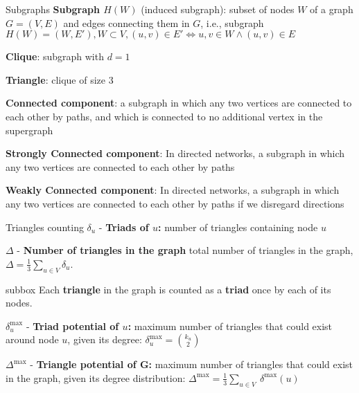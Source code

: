 \begin{textbox}{Subgraphs}
    \textbf{Subgraph $H(W)$} (induced subgraph): subset of nodes $W$ of a graph $G=(V,E)$ and edges connecting them in $G$, i.e., subgraph $H(W)=(W,E'), W \subset V, (u,v) \in E' \iff u,v \in W \wedge (u,v) \in E$

    \textbf{Clique}: subgraph with $d=1$

    \textbf{Triangle}: clique of size 3

    \textbf{Connected component}: a subgraph in which any two vertices are connected to each other by paths, and which is connected to no additional vertex in the supergraph

    \textbf{Strongly Connected component}: In directed networks, a subgraph in which any two vertices are connected to each other by paths

    \textbf{Weakly Connected component}: In directed networks, a subgraph in which any two vertices are connected to each other by paths if we disregard directions
\end{textbox}


\begin{textbox}{Triangles counting}
    $\delta_u$ - \textbf{Triads of $u$:} number of triangles containing node $u$

    $\Delta$ - \textbf{Number of triangles in the graph} total number of triangles in the graph, $\Delta=\frac{1}{3}\sum_{u\in V}\delta_u$.

    \begin{subbox}{subbox}{}
        \tiny{Each \textbf{triangle} in the graph is counted as a \textbf{triad} once by each of its nodes. }
    \end{subbox}

    $\delta^{\max}_u$ - \textbf{Triad potential of $u$:} maximum number of triangles that could exist around node $u$, given its degree: $\delta^{\max}_u=\binom {k_{u}}{2}$

    $\Delta^{\max}$ - \textbf{Triangle potential of G:} maximum number of triangles that could exist in the graph, given its degree distribution: $\Delta^{\max}=\frac {1}{3}\sum_{u\in V}\ \delta^{\max} (u)$
\end{textbox}


